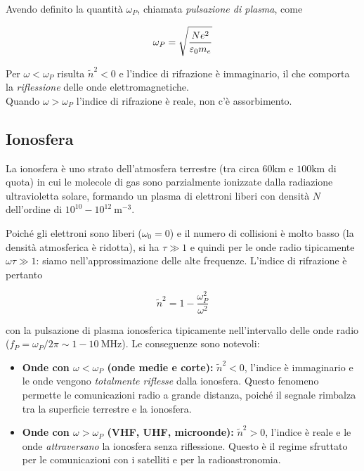 Avendo definito la quantità $\omega_P$, chiamata \emph{pulsazione di plasma}, come 

\begin{tcolorbox}[colback=yellow!10!white, colframe=orange!70!black, boxrule=0.8pt]
\begin{equation}
    \omega_P = \sqrt{\frac{N e^2}{\varepsilon_0 m_e}}
\end{equation}
\end{tcolorbox}

Per $\omega < \omega_P$ risulta $\tilde{n}^2 < 0$ e l’indice di rifrazione è immaginario, il che comporta la \emph{riflessione} delle onde elettromagnetiche. \\
Quando $\omega > \omega_P$ l’indice di rifrazione è reale, non c’è assorbimento.

\subsection*{Ionosfera}

La ionosfera è uno strato dell'atmosfera terrestre (tra circa $60 \text{km}$ e $100 \text{km}$ di quota) in cui le molecole di gas sono parzialmente ionizzate dalla radiazione ultravioletta solare, formando un plasma di elettroni liberi con densità $N$ dell'ordine di $10^{10} - 10^{12}\ \text{m}^{-3}$.

Poiché gli elettroni sono liberi ($\omega_0 = 0$) e il numero di collisioni è molto basso (la densità atmosferica è ridotta), si ha $\tau \gg 1$ e quindi per le onde radio tipicamente $\omega \tau \gg 1$: siamo nell'approssimazione delle alte frequenze. 
L'indice di rifrazione è pertanto

\begin{tcolorbox}[colback=yellow!10!white, colframe=orange!70!black, boxrule=0.8pt]
\begin{equation}
    \tilde{n}^2 = 1 - \frac{\omega_P^2}{\omega^2}
\end{equation}
\end{tcolorbox}

con la pulsazione di plasma ionosferica tipicamente nell'intervallo delle onde radio ($f_P = \omega_P / 2\pi \sim 1 - 10 \ \text{MHz}$). Le conseguenze sono notevoli:

\begin{itemize}
    \item \textbf{Onde con $\omega < \omega_P$ (onde medie e corte):} $\tilde{n}^2 < 0$, l'indice è immaginario e le onde vengono \emph{totalmente riflesse} dalla ionosfera. 
    Questo fenomeno permette le comunicazioni radio a grande distanza, poiché il segnale rimbalza tra la superficie terrestre e la ionosfera.

    \item \textbf{Onde con $\omega > \omega_P$ (VHF, UHF, microonde):} $\tilde{n}^2 > 0$, l'indice è reale e le onde \emph{attraversano} la ionosfera senza riflessione. 
    Questo è il regime sfruttato per le comunicazioni con i satelliti e per la radioastronomia.
\end{itemize}


